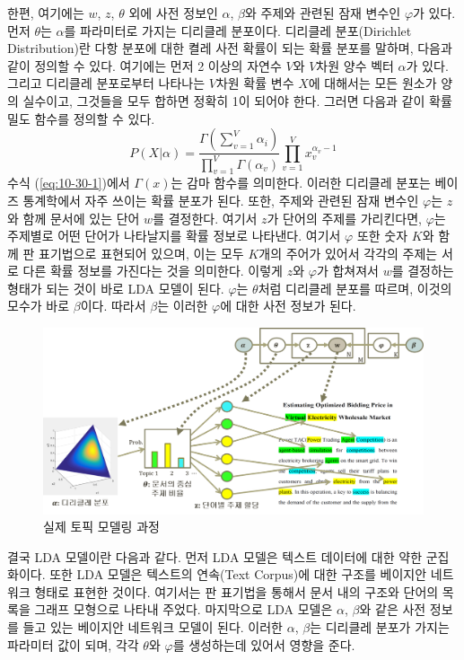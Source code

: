 \documentclass[a4paper]{oblivoir}
\begin{document}
한편, 여기에는 $w$, $z$, $\theta$ 외에 사전 정보인 $\alpha$, $\beta$와 주제와 관련된 잠재 변수인 $\varphi$가 있다. 먼저 $\theta$는 $\alpha$를 파라미터로 가지는 디리클레 분포이다. 디리클레 분포(Dirichlet Distribution)란 다항 분포에 대한 켤레 사전 확률이 되는 확률 분포를 말하며, 다음과 같이 정의할 수 있다. 여기에는 먼저 2 이상의 자연수 $V$와 $V$차원 양수 벡터 $\alpha$가 있다. 그리고 디리클레 분포로부터 나타나는 $V$차원 확률 변수 $X$에 대해서는 모든 원소가 양의 실수이고, 그것들을 모두 합하면 정확히 1이 되어야 한다. 그러면 다음과 같이 확률 밀도 함수를 정의할 수 있다. 
\begin{equation}
P(X|\alpha) = \frac{\Gamma(\sum_{v=1}^{V} \alpha_{i})}{\prod_{v=1}^{V} \Gamma(\alpha_{v})} \prod_{v=1}^{V} x_{v}^{\alpha_{v}-1}
\label{eq:10-30-1}
\end{equation} 
수식 (\ref{eq:10-30-1})에서 $\Gamma(x)$는 감마 함수를 의미한다. 이러한 디리클레 분포는 베이즈 통계학에서 자주 쓰이는 확률 분포가 된다. 또한, 주제와 관련된 잠재 변수인 $\varphi$는 $z$와 함께 문서에 있는 단어 $w$를 결정한다. 여기서 $z$가 단어의 주제를 가리킨다면, $\varphi$는 주제별로 어떤 단어가 나타날지를 확률 정보로 나타낸다. 여기서 $\varphi$ 또한 숫자 $K$와 함께 판 표기법으로 표현되어 있으며, 이는 모두 $K$개의 주어가 있어서 각각의 주제는 서로 다른 확률 정보를 가진다는 것을 의미한다. 이렇게 $z$와 $\varphi$가 합쳐져서 $w$를 결정하는 형태가 되는 것이 바로 LDA 모델이 된다. $\varphi$는 $\theta$처럼 디리클레 분포를 따르며, 이것의 모수가 바로 $\beta$이다. 따라서 $\beta$는 이러한 $\varphi$에 대한 사전 정보가 된다. \\

\begin{figure}[ht] \centering 
\includegraphics[scale=0.5]{fig10_20.png} 
\caption{실제 토픽 모델링 과정}
\label{fig:10-21}
\end{figure}

결국 LDA 모델이란 다음과 같다. 먼저 LDA 모델은 텍스트 데이터에 대한 약한 군집화이다. 또한 LDA 모델은 텍스트의 연속(Text Corpus)에 대한 구조를 베이지안 네트워크 형태로 표현한 것이다. 여기서는 판 표기법을 통해서 문서 내의 구조와 단어의 목록을 그래프 모형으로 나타내 주었다. 마지막으로 LDA 모델은 $\alpha$, $\beta$와 같은 사전 정보를 들고 있는 베이지안 네트워크 모델이 된다. 이러한 $\alpha$, $\beta$는 디리클레 분포가 가지는 파라미터 값이 되며, 각각 $\theta$와 $\varphi$를 생성하는데 있어서 영향을 준다. \\
\end{document}
